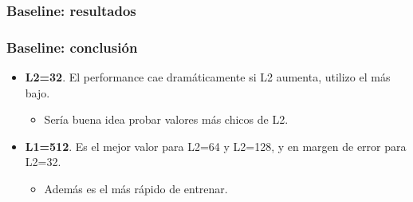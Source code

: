 \begin{frame}
\frametitle{Baseline: resultados}
\begin{figure}
\centering
{}
\end{figure}
\end{frame}

\begin{frame}
\frametitle{Baseline: conclusión}
\begin{itemize}
\item \textbf{L2=32}. El performance cae dramáticamente si L2 aumenta, utilizo el más bajo.
\begin{itemize}
    \item Sería buena idea probar valores más chicos de L2. \pause
\end{itemize}
\item \textbf{L1=512}. Es el mejor valor para L2=64 y L2=128, y en margen de error para L2=32.
\begin{itemize}
    \item Además es el más rápido de entrenar.
\end{itemize}
\end{itemize}
\end{frame}

